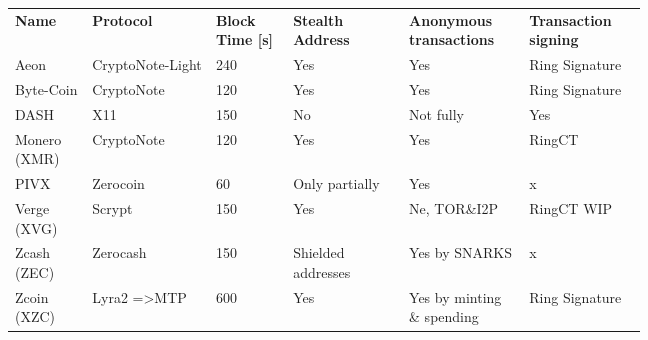 \documentclass[
  printed, %
  table,   %
  nolof,     %
  nolot,     %
           oneside, color
]{fithesis3}
\begin{document}

\begin{figure}[H]
\centering
\begin{tabular}{p{0.1\linewidth}p{0.16\linewidth}p{0.1\linewidth}p{0.15\linewidth}p{0.15\linewidth}p{0.15\linewidth}}
\textbf{Name}        & \textbf{Protocol}                & \textbf{Block Time {[}s{]}} & \textbf{Stealth Address    }      & \textbf{Anonymous transactions} & \textbf{Transaction signing}  \\
Aeon         & CryptoNote-Light        & 240                & Yes                      & Yes                & Ring Signature \\
Byte-Coin     & CryptoNote              & 120                & Yes                      & Yes                & Ring Signature \\
DASH         & X11                     & 150                & No                       & Not fully           & Yes            \\
Monero (XMR) & CryptoNote              & 120                & Yes                      & Yes                & RingCT         \\
PIVX         & Zerocoin                & 60                 & Only partially & Yes                & x              \\
Verge (XVG)  & Scrypt                  & 150                & Yes                      & Ne, TOR\&I2P       & RingCT WIP     \\
Zcash (ZEC)  & Zerocash                & 150                & Shielded addresses  & Yes by SNARKS    & x              \\
Zcoin (XZC)  & Lyra2 =\textgreater MTP & 600                & Yes                      & Yes by minting \& spending  & Ring Signature

\end{tabular}
\label{table:monero-alternatives}

\end{figure}
\end{document}
